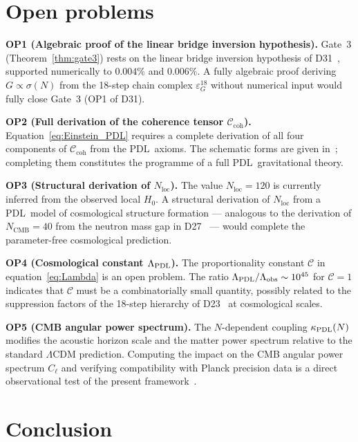 \documentclass[11pt,a4paper]{article}
\theoremstyle{definition}
\newcommand{\PDL}{\textnormal{PDL}}
\newcommand{\sig}{\sigma}
\newcommand{\kPDL}{\kappa_{\PDL}}
\newcommand{\Ccoh}{\mathcal{C}_{\mathrm{coh}}}
\begin{document}
\section{Open problems}
\label{sec:open}

\textbf{OP1 (Algebraic proof of the linear bridge inversion hypothesis).} Gate~3 (Theorem~\ref{thm:gate3}) rests on the linear bridge inversion hypothesis of D31~\cite{PDL_D31_2026}, supported numerically to $0.004\%$ and $0.006\%$. A fully algebraic proof deriving $G \propto \sig(N)$ from the 18-step chain complex $\varepsilon_G^{18}$ without numerical input would fully close Gate~3 (OP1 of D31).

\textbf{OP2 (Full derivation of the coherence tensor $\Ccoh$).} Equation~\eqref{eq:Einstein_PDL} requires a complete derivation of all four components of $\Ccoh$ from the \PDL\ axioms. The schematic forms are given in~\cite{Einstein_Dirac_PDL_2026}; completing them constitutes the programme of a full \PDL\ gravitational theory.

\textbf{OP3 (Structural derivation of $N_{\mathrm{loc}}$).} The value $N_{\mathrm{loc}} = 120$ is currently inferred from the observed local $H_0$. A structural derivation of $N_{\mathrm{loc}}$ from a \PDL\ model of cosmological structure formation --- analogous to the derivation of $N_{\mathrm{CMB}} = 40$ from the neutron mass gap in D27~\cite{N_CMB_PDL_2026} --- would complete the parameter-free cosmological prediction.

\textbf{OP4 (Cosmological constant $\Lambda_{\PDL}$).} The proportionality constant $\mathcal{C}$ in equation~\eqref{eq:Lambda} is an open problem. The ratio $\Lambda_{\PDL}/\Lambda_{\mathrm{obs}} \sim 10^{45}$ for $\mathcal{C} = 1$ indicates that $\mathcal{C}$ must be a combinatorially small quantity, possibly related to the suppression factors of the 18-step hierarchy of D23~\cite{Topology_18_PDL_2026} at cosmological scales.

\textbf{OP5 (CMB angular power spectrum).} The $N$-dependent coupling $\kPDL(N)$ modifies the acoustic horizon scale and the matter power spectrum relative to the standard $\Lambda$CDM prediction. Computing the impact on the CMB angular power spectrum $C_\ell$ and verifying compatibility with Planck precision data is a direct observational test of the present framework~\cite{Planck2018}.

\section*{Conclusion}
\end{document}
